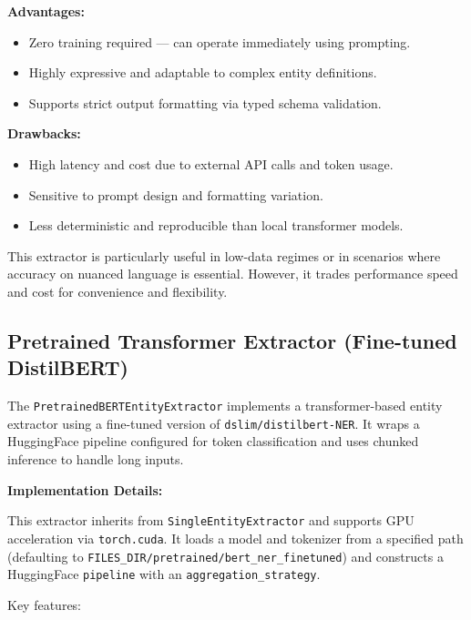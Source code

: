 \textbf{Advantages:}
\begin{itemize}
  \item Zero training required — can operate immediately using prompting.
  \item Highly expressive and adaptable to complex entity definitions.
  \item Supports strict output formatting via typed schema validation.
\end{itemize}

\textbf{Drawbacks:}
\begin{itemize}
  \item High latency and cost due to external API calls and token usage.
  \item Sensitive to prompt design and formatting variation.
  \item Less deterministic and reproducible than local transformer models.
\end{itemize}

This extractor is particularly useful in low-data regimes or in scenarios where accuracy on nuanced language is essential. However, it trades performance speed and cost for convenience and flexibility.


\subsection{Pretrained Transformer Extractor (Fine-tuned DistilBERT)}

The \texttt{PretrainedBERTEntityExtractor} implements a transformer-based entity extractor using a fine-tuned version of \texttt{dslim/distilbert-NER}. It wraps a HuggingFace pipeline configured for token classification and uses chunked inference to handle long inputs.

\textbf{Implementation Details:}

This extractor inherits from \texttt{SingleEntityExtractor} and supports GPU acceleration via \texttt{torch.cuda}. It loads a model and tokenizer from a specified path (defaulting to \texttt{FILES\_DIR/pretrained/bert\_ner\_finetuned}) and constructs a HuggingFace \texttt{pipeline} with an \texttt{aggregation\_strategy}.

Key features:

